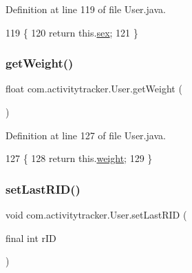 Definition at line 119 of file User.\+java.


\begin{DoxyCode}
119                         \{
120         \textcolor{keywordflow}{return} this.\mbox{\hyperlink{classcom_1_1activitytracker_1_1_user_adcbddd2e965af4e227f7cf0582a3e13d}{sex}};
121     \}
\end{DoxyCode}
\mbox{\label{classcom_1_1activitytracker_1_1_user_ad15d7b4f96adb6d1a14054bf3eb7e4e0}} 
\subsubsection{\texorpdfstring{get\+Weight()}{getWeight()}}
{\footnotesize\ttfamily float com.\+activitytracker.\+User.\+get\+Weight (\begin{DoxyParamCaption}{ }\end{DoxyParamCaption})}



Definition at line 127 of file User.\+java.


\begin{DoxyCode}
127                              \{
128         \textcolor{keywordflow}{return} this.\mbox{\hyperlink{classcom_1_1activitytracker_1_1_user_a8a30c6c08983e513b462bcc035434c9e}{weight}};
129     \}
\end{DoxyCode}
\mbox{\label{classcom_1_1activitytracker_1_1_user_a9e91c79596a9a4dfda7b3453b61ff8d2}} 
\subsubsection{\texorpdfstring{set\+Last\+R\+I\+D()}{setLastRID()}}
{\footnotesize\ttfamily void com.\+activitytracker.\+User.\+set\+Last\+R\+ID (\begin{DoxyParamCaption}\item[{final int}]{r\+ID }\end{DoxyParamCaption})}



